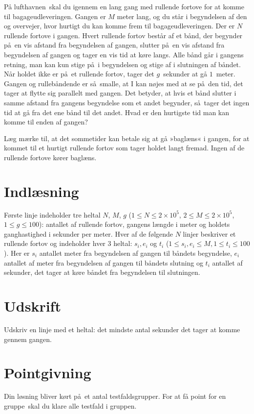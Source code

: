 
På lufthavnen skal du igennem en lang gang med rullende fortove for at komme til bagageudleveringen.
Gangen er $M$ meter lang, og du står i begyndelsen af den og overvejer, hvor hurtigt du kan komme frem til bagageudleveringen. 
Der er $N$ rullende fortove i gangen.
Hvert rullende fortov består af et bånd, der begynder på en vis afstand fra begyndelsen af gangen, slutter på en vis afstand fra begyndelsen af gangen og tager en vis tid at køre langs.
Alle bånd går i gangens retning, man kan kun stige på i begyndelsen og stige af i slutningen af båndet.
Når holdet ikke er på et rullende fortov, tager det $g$~sekunder at gå $1$~meter.
Gangen og rullebåndende er så smalle, at I kan nøjes med at se på den tid, det tager at flytte sig parallelt med gangen.
Det betyder, at hvis et bånd slutter i samme afstand fra gangens begyndelse som et andet begynder, så tager det ingen tid at gå fra det ene bånd til det andet.
Hvad er den hurtigste tid man kan komme til enden af gangen?

Læg mærke til, at det sommetider kan betale sig at gå »baglæns« i gangen, for at kommet til et hurtigt rullende fortov som tager holdet langt fremad.
Ingen af de rullende fortove kører baglæns.

\section*{Indlæsning}
Første linje indeholder tre heltal $N$, $M$, $g$ ($1 \le N \le 2 \times 10^5$, $2 \le M \le 2 \times 10^5$, $1 \le g \le 100$):
antallet af rullende fortov, gangens længde i meter og holdets ganghastighed i sekunder per meter.
Hver af de følgende $N$ linjer beskriver et rullende fortov og indeholder hver 3 heltal: $s_i, e_i$ og $t_i$
($1\leq s_i,e_i\leq M,1\leq t_i\leq100$).
Her er $s_i$  antallet meter fra begyndelsen af gangen til båndets begyndelse, $e_i$ antallet af meter fra begyndelsen af gangen til båndets slutning og $t_i$ antallet af sekunder, det tager at køre båndet fra begyndelsen til slutningen.

\section*{Udskrift}
Udskriv en linje med et heltal: det mindste antal sekunder det tager at komme gennem gangen.

\section*{Pointgivning}
Din løsning bliver kørt på et antal testfaldsgrupper.
For at få point for en gruppe skal du klare alle testfald i gruppen.

